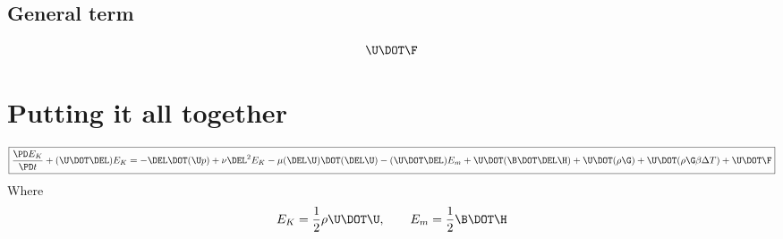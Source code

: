 \documentclass[11pt]{article}
\begin{document}
\subsection{General term}
\begin{equation}
	\U \DOT \F
\end{equation}

\section{Putting it all together}
\begin{equation}
	\boxed{
	\frac{\PD E_K}{\PD t} + 
	(\U \DOT \DEL) E_K = 
	- \DEL \DOT (\U p)
	+ \nu \DEL^2 E_K
	- \mu (\DEL \U) \DOT (\DEL \U)
	- (\U \DOT \DEL) E_m
	+ \U \DOT (\B \DOT \DEL \H)
	+ \U \DOT (\rho \G)
	+ \U \DOT (\rho \G \beta \Delta T)
	+ \U \DOT \F
	}
\end{equation}
Where
\begin{equation}
	E_K = \frac{1}{2} \rho \U \DOT \U, \qquad
	E_m = \frac{1}{2} \B \DOT \H
\end{equation}
\end{document}
